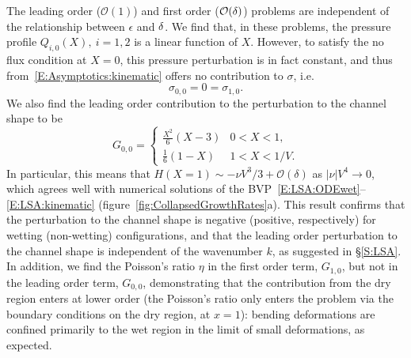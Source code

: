 \documentclass{jfm}
\newcommand{\order}[1]{\mathcal{O}\left(#1\right)}
\newcommand{\poisson}{\eta} %
\begin{document}
The leading order ($\mathcal{O}(1)$) and first order ($\mathcal{O}(\delta)$) problems are independent of the relationship between $\epsilon$ and $\delta$. We find that, in these problems, the pressure profile $Q_{i,0}(X),~i = 1,2$ is a linear function of $X$. However, to satisfy the no flux condition at $X =0$, this pressure perturbation is in fact constant, and thus from~\eqref{E:Asymptotics:kinematic} offers no contribution to $\sigma$, i.e.
\begin{equation}
\sigma_{0,0} = 0 = \sigma_{1,0}.
\end{equation}
We also find the leading order contribution to the perturbation to the channel shape to be
\begin{equation}\label{E:Asymptotics:ChannelShapeSolution}
G_{0,0} =\begin{cases}
\frac{X^2}{6}(X - 3) & 0 < X < 1,\\
\frac{1}{6}(1-X) & 1 < X < 1/V.
\end{cases}
\end{equation}
In particular, this means that $H(X=1) \sim -\nu V^3/3 + \order{\delta}$ as $|\nu| V^4 \to 0$, which agrees well with numerical solutions of the BVP~\eqref{E:LSA:ODEwet}--\eqref{E:LSA:kinematic} (figure~\ref{fig:CollapsedGrowthRates}a). This result confirms that the perturbation to the channel shape is negative (positive, respectively) for wetting (non-wetting) configurations, and that the leading order perturbation to the channel shape is independent of the wavenumber $k$, as suggested in \S\ref{S:LSA}. In addition, we find the Poisson's ratio $\poisson$ in the first order term, $G_{1,0}$, but not in the leading order term, $G_{0,0}$, demonstrating that the contribution from the dry region enters at lower order (the Poisson's ratio only enters the problem via the boundary conditions on the dry region, at $x = 1$): bending deformations are confined primarily to the wet region in the limit of small deformations, as expected.
\end{document}
